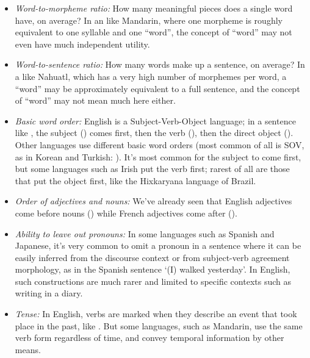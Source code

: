 \begin{itemize}

\item \emph{Word-to-morpheme ratio:}  How many meaningful pieces does a single word have, on average?  In an  like Mandarin, where one morpheme is roughly equivalent to one syllable and one ``word'', the concept of ``word'' may not even have much independent utility.

\item \emph{Word-to-sentence ratio:}  How many words make up a sentence, on average?  In a  like Nahuatl, which has a very high number of morphemes per word, a ``word'' may be approximately equivalent to a full sentence, and the concept of ``word'' may not mean much here either.

\item \emph{Basic word order:} English is a Subject-Verb-Object language; in a sentence like , the subject () comes first, then the verb (), then the direct object ().  Other languages use different basic word orders (most common of all is SOV, as in Korean and Turkish: ). It's most common for the subject to come first, but some languages such as Irish put the verb first; rarest of all are those that put the object first, like the  Hixkaryana language of Brazil.

\item \emph{Order of adjectives and nouns:}  We've already seen that English adjectives come before nouns () while French adjectives come after ().

\item \emph{Ability to leave out pronouns:} In some languages such as Spanish and Japanese, it's very common to omit a pronoun in a sentence where it can be easily inferred from the discourse context or from subject-verb agreement morphology, as in the Spanish sentence  `(I) walked yesterday'.  In English, such constructions are much rarer and limited to specific contexts such as writing in a diary. 

\item \emph{Tense:} In English, verbs are marked when they describe an event that took place in the past, like .  But some languages, such as Mandarin, use the same verb form regardless of time, and convey temporal information by other means.


\end{itemize}
